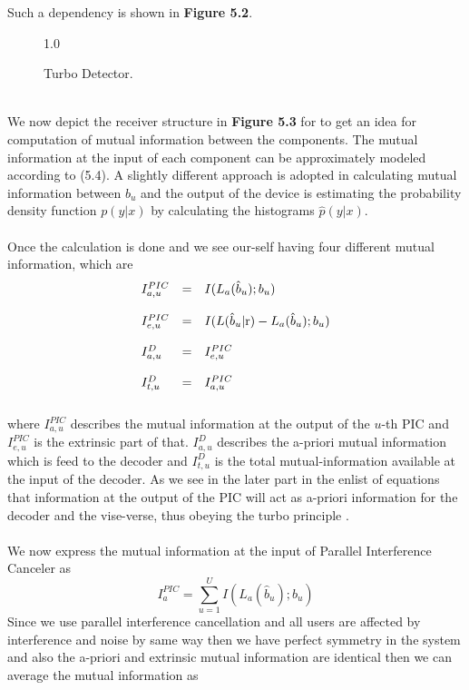 Such a dependency is shown in \textbf{Figure 5.2}.
\begin{figure}[htb]
\centerline{  {1.0} }
\caption{Turbo Detector.}
\end{figure}\\
We now depict the receiver structure in \textbf{Figure 5.3} for to get an idea for computation of mutual information between the components. The mutual information at the input of each component can be approximately modeled according to (5.4). A slightly different approach is adopted in calculating mutual information between $b_u$ and the output of the device is estimating the probability density function $p(y\vert x)$ by calculating the histograms $\hat{p}(y\vert x)$.\\ \\
Once the calculation is done and we see our-self having four different mutual information, which are
\begin{eqnarray}
\begin{array}{lll}
I_{a,u}^{\tiny PIC}&=&I(L_a(\hat{b}_u);b_u) \\ \\
I_{e,u}^{\tiny PIC}&=&I(L(\hat{b}_u\vert \mathbf{\mathrm{r}})-L_a(\hat{b}_u);b_u) \\ \\
I_{a,u}^D&=&I_{e,u}^{\tiny PIC} \\ \\
I_{t,u}^D&=&I_{a,u}^{\tiny PIC} \\ \\
\end{array}
\end{eqnarray}
where $I_{a,u}^{PIC}$ describes the mutual information at the output of the $u$-th PIC and $I_{e,u}^{PIC}$ is the extrinsic part of that. $I_{a,u}^{D}$ describes the a-priori mutual information which is feed to the decoder and $I_{t,u}^{D}$ is the total mutual-information available at the input of the decoder. As we see in the later part in the enlist of equations that information at the output of the PIC will act as a-priori information for the decoder and the vise-verse, thus obeying the turbo principle \cite{Kuehn}.\\ \\
We now express the mutual information at the input of Parallel Interference Canceler as 
\begin{equation}
I_a^{PIC}=\sum\limits_{u=1}^{U}I(L_a(\hat{b}_u);b_u)
\end{equation}
Since we use parallel interference cancellation and all users are affected by interference and noise by same way then we have perfect symmetry in the system and also the a-priori and extrinsic mutual information are identical then we can average the mutual information as
